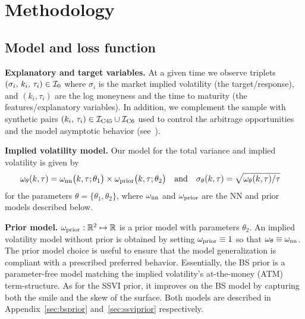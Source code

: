  
\section{Methodology} \label{sec:smoo}

\subsection{Model and loss function} \label{sec:archlearn}

\textbf{Explanatory and target variables.}
At a given time we observe triplets $(\sigma_i, \, k_i, \, \tau_i)\in{\mathcal I}_{\rm 0}$
where $\sigma_i$ is the market implied volatility (the target/response), and $(k_i, \tau_i)$ are the log moneyness and the time to maturity (the features/explanatory variables).
In addition, we complement the sample with synthetic pairs $(k_i, \, \tau_i)\in {{\mathcal I}_{\rm C45}} \cup{{\mathcal I}_{\rm C6}}$ used to control the arbitrage opportunities and the model asymptotic behavior (see~).

\textbf{Implied volatility model.}
Our model for the total variance and implied volatility is given by
\begin{align}\label{eq:iv_ann}
\omega_{\theta}(k,\tau) &= \omega_{\rm nn}\big(k,\tau;\theta_1\big) \times \omega_{\rm prior}\big(k,\tau;\theta_2\big)  \quad \mbox{and} \quad
\sigma_{\theta}(k,\tau) = \sqrt{\omega_{\theta}(k,\tau)/\tau}
\end{align} 
for the parameters $\theta=\{\theta_1, \theta_2\}$, where
$\omega_{\rm nn}$ and $\omega_{\rm prior}$ are the NN and prior models described below.

\textbf{Prior model.}
$\omega_{\rm prior}:{\mathbb R}^2\mapsto{\mathbb R}$ is a prior model with parameters $\theta_2$.
An implied volatility model without prior is obtained by setting $\omega_{\rm prior}\equiv 1$ so that $\omega_{\theta} \equiv \omega_{\rm nn} $. 
The prior model choice is useful to ensure that the model generalization is compliant with a prescribed preferred behavior.
Essentially, the BS prior is a parameter-free model matching the implied volatility's at-the-money (ATM) term-structure.
As for the SSVI prior, it improves on the BS model by capturing both the smile and the skew of the surface.
Both models are described in Appendix~\ref{sec:bsprior} and~\ref{sec:ssviprior} respectively.

